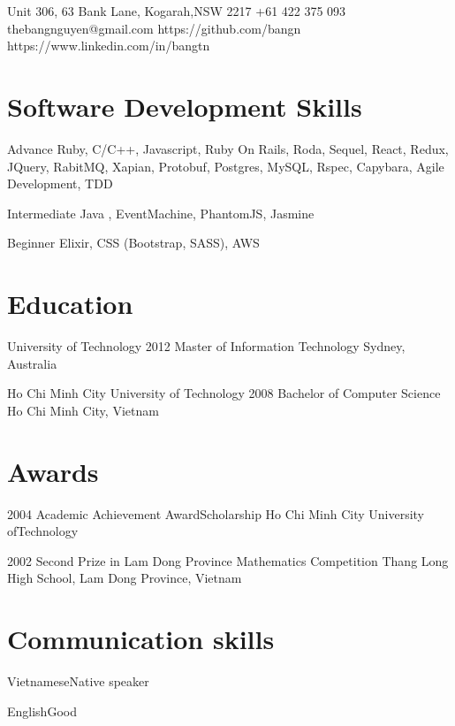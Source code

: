\documentclass{tccv}
\begin{document}
\personal
    {Unit 306, 63 Bank Lane, Kogarah,\newline NSW 2217}
    {+61 422 375 093}
    {thebangnguyen@gmail.com}
    {https://github.com/bangn}
    {https://www.linkedin.com/in/bangtn}

\section{Software Development Skills}

\begin{factlist}

\item{Advance}
     {Ruby, C/C++, Javascript,
     Ruby On Rails, Roda, Sequel, React, Redux, JQuery,
     RabitMQ, Xapian, Protobuf,
     Postgres, MySQL,
     \newline Rspec, Capybara,
     \newline Agile Development, TDD}

\item{Intermediate}
     {Java , EventMachine, PhantomJS, Jasmine}

\item{Beginner}
     {Elixir, CSS (Bootstrap, SASS), AWS}
\end{factlist}

\section{Education}

\begin{yearlist}

\item[University of Technology]{2012}
     {Master of Information Technology}
     {Sydney, Australia}

\item[Ho Chi Minh City University of Technology]{2008}
     {Bachelor of Computer Science}
     {Ho Chi Minh City, Vietnam}

\end{yearlist}

\section{Awards}

\begin{yearlist}

\item{2004}
     {Academic Achievement Award\newline Scholarship}
     {Ho Chi Minh City University of\newline Technology}

\item{2002}
     {Second Prize in Lam Dong Province Mathematics Competition}
     {Thang Long High School, Lam Dong Province, Vietnam}

\end{yearlist}

\section{Communication skills}

\begin{factlist}
\item{Vietnamese}{Native speaker}
\item{English}{Good}
\end{factlist}
\end{document}
